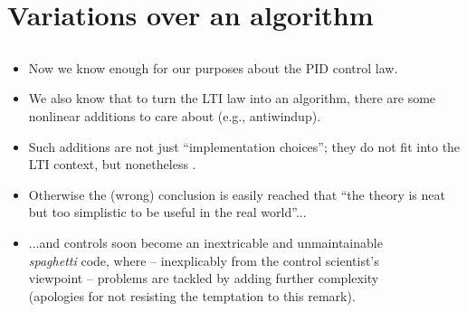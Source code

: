 \section{Variations over an algorithm}
\subsection{}

\begin{frame}
\framesubtitleTC{}
\myPause
 \begin{itemize}[<+-| alert@+>]
 \item Now we know enough for our purposes about the PID control law.
 \item We also know that to turn the LTI law into an algorithm, there are some nonlinear additions
       to care about (e.g., antiwindup).
 \item Such additions are not just ``implementation choices''; they do not fit into the LTI
       context, but nonetheless .
 \item Otherwise the (wrong) conclusion is easily reached that ``the theory is neat but too
       simplistic to be useful in the real world''...
 \item ...and controls soon become an inextricable and unmaintainable\\
       \emph{spaghetti} code, where -- inexplicably from the control scientist's\\
       viewpoint --  problems are tackled by adding further complexity\\
       (apologies for not resisting the temptation to this remark).
 \end{itemize}
\end{frame}

